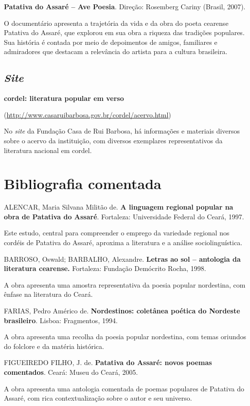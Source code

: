 \documentclass[12pt]{extarticle}
\begin{document}
  \textbf{Patativa do Assaré -- Ave Poesia}. Direção: Rosemberg Cariny
  (Brasil, 2007).

O documentário apresenta a trajetória da vida e da obra do poeta
cearense Patativa do Assaré, que explorou em sua obra a riqueza das
tradições populares. Sua história é contada por meio de depoimentos de
amigos, familiares e admiradores que destacam a relevância do artista
para a cultura brasileira.


  \subsection{\emph{Site}}


\textbf{cordel: literatura popular em verso }

(\url{http://www.casaruibarbosa.gov.br/cordel/acervo.html})

No \emph{site} da Fundação Casa de Rui Barbosa, há informações e
materiais diversos sobre o acervo da instituição, com diversos
exemplares representativos da literatura nacional em cordel.

\section{Bibliografia comentada}


  ALENCAR, Maria Silvana Militão de. \textbf{A linguagem regional
  popular na obra de Patativa do Assaré}. Fortaleza: Universidade
  Federal do Ceará, 1997.

Este estudo, central para compreender o emprego da variedade regional
nos cordéis de Patativa do Assaré, aproxima a literatura e a análise
sociolinguística.


  BARROSO, Oswald; BARBALHO, Alexandre. \textbf{Letras ao sol --
  antologia da literatura cearense.} Fortaleza: Fundação Demócrito
  Rocha, 1998.

A obra apresenta uma amostra representativa da poesia popular
nordestina, com ênfase na literatura do Ceará.


  FARIAS, Pedro Américo de. \textbf{Nordestinos: coletânea poética do
  Nordeste brasileiro}. Lisboa: Fragmentos, 1994.

A obra apresenta uma recolha da poesia popular nordestina, com temas
oriundos do folclore e da matéria histórica.


  FIGUEIREDO FILHO, J. de. \textbf{Patativa do Assaré: novos poemas
  comentados}. Ceará: Museu do Ceará, 2005.

A obra apresenta uma antologia comentada de poemas populares de Patativa
do Assaré, com rica contextualização sobre o autor e seu universo.
\end{document}

